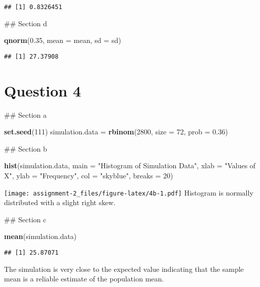 \documentclass[
]{article}
\newenvironment{Shaded}{\begin{snugshade}}{\end{snugshade}}
\newcommand{\AttributeTok}[1]{\textcolor[rgb]{0.13,0.29,0.53}{#1}}
\newcommand{\DecValTok}[1]{\textcolor[rgb]{0.00,0.00,0.81}{#1}}
\newcommand{\FloatTok}[1]{\textcolor[rgb]{0.00,0.00,0.81}{#1}}
\newcommand{\FunctionTok}[1]{\textcolor[rgb]{0.13,0.29,0.53}{\textbf{#1}}}
\newcommand{\NormalTok}[1]{#1}
\newcommand{\OtherTok}[1]{\textcolor[rgb]{0.56,0.35,0.01}{#1}}
\newcommand{\StringTok}[1]{\textcolor[rgb]{0.31,0.60,0.02}{#1}}
\begin{document}
\begin{verbatim}
## [1] 0.8326451
\end{verbatim}

\#\# Section d

\begin{Shaded}
\begin{Highlighting}[]
  \FunctionTok{qnorm}\NormalTok{(}\FloatTok{0.35}\NormalTok{, }\AttributeTok{mean =}\NormalTok{ mean, }\AttributeTok{sd =}\NormalTok{ sd)}
\end{Highlighting}
\end{Shaded}

\begin{verbatim}
## [1] 27.37908
\end{verbatim}

\hypertarget{question-4}{%
\section{Question 4}\label{question-4}}

\#\# Section a

\begin{Shaded}
\begin{Highlighting}[]
  \FunctionTok{set.seed}\NormalTok{(}\DecValTok{111}\NormalTok{)}
\NormalTok{  simulation.data }\OtherTok{=} \FunctionTok{rbinom}\NormalTok{(}\DecValTok{2800}\NormalTok{, }\AttributeTok{size =} \DecValTok{72}\NormalTok{, }\AttributeTok{prob =} \FloatTok{0.36}\NormalTok{)}
\end{Highlighting}
\end{Shaded}

\#\# Section b

\begin{Shaded}
\begin{Highlighting}[]
  \FunctionTok{hist}\NormalTok{(simulation.data, }
     \AttributeTok{main =} \StringTok{"Histogram of Simulation Data"}\NormalTok{,}
     \AttributeTok{xlab =} \StringTok{"Values of X"}\NormalTok{,}
     \AttributeTok{ylab =} \StringTok{"Frequency"}\NormalTok{,}
     \AttributeTok{col =} \StringTok{"skyblue"}\NormalTok{,  }
     \AttributeTok{breaks =} \DecValTok{20}\NormalTok{) }
\end{Highlighting}
\end{Shaded}

\texttt{[image: assignment-2\_files/figure-latex/4b-1.pdf]} Histogram is
normally distributed with a slight right skew.

\#\# Section c

\begin{Shaded}
\begin{Highlighting}[]
  \FunctionTok{mean}\NormalTok{(simulation.data)}
\end{Highlighting}
\end{Shaded}

\begin{verbatim}
## [1] 25.87071
\end{verbatim}

The simulation is very close to the expected value indicating that the
sample mean is a reliable estimate of the population mean.
\end{document}
